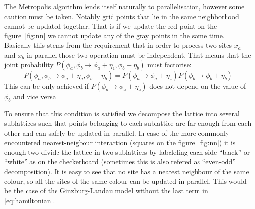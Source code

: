 \documentclass[a4paper]{llncs}
\begin{document}
The Metropolis algorithm lends itself naturally to parallelisation,
however some caution must be taken. Notably grid points that lie in
the same neighborhood cannot be updated together. That is if we update
the red point on the figure~\ref{fig:nn} we cannot update any of the
gray points in the same time.  Basically this stems from the
requirement that in order to process two sites $x_a$ and $x_b$ in
parallel those two operation must be independent.  That means that the
joint probability
$P(\phi_a,\phi_b\rightarrow\phi_a+\eta_a,\phi_b+\eta_b)$ must
factorise:
\begin{equation}
P(\phi_a,\phi_b\rightarrow\phi_a+\eta_a,\phi_b+\eta_b)
=P(\phi_a\rightarrow\phi_a+\eta_a)P(\phi_b\rightarrow\phi_b+\eta_b)
\end{equation}
This can be only achieved if $P(\phi_a\rightarrow\phi_a+\eta_a)$ does
not depend on the value of $\phi_b$ and vice versa.

To ensure that this condition is satisfied we decompose the lattice
into several sublattices such that points belonging to each sublattice
are far enough from each other and can safely be updated in
parallel. In case of the more commonly encountered nearest-neigbour
interaction (squares on the figure~\ref{fig:nn}) it is enough two
divide the lattice in two sublattices by labeleling each side
``black'' or ``white'' as on the checkerboard (sometimes this is also
refered as ``even-odd'' decomposition). It is easy to see that no site
has a nearest neighbour of the same colour, so all the sites of the
same colour can be updated in parallel. This would be the case of the
Ginzburg-Landau model without the last term in \eqref{eq:hamiltonian}.
\end{document}
